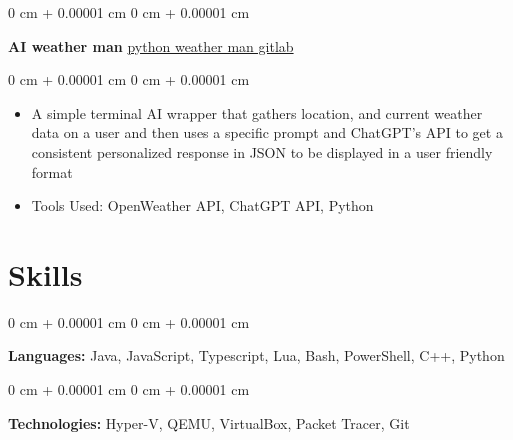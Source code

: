 \documentclass[10pt, letterpaper]{article}
\newenvironment{highlights}{
    \begin{itemize}[
        topsep=0.10 cm,
        parsep=0.10 cm,
        partopsep=0pt,
        itemsep=0pt,
        leftmargin=0 cm + 10pt
    ]
}{
    \end{itemize}
} %
\newenvironment{onecolentry}{
    \begin{adjustwidth}{
        0 cm + 0.00001 cm
    }{
        0 cm + 0.00001 cm
    }
}{
    \end{adjustwidth}
} %
\newenvironment{twocolentry}[2][]{
    \onecolentry
    \def\secondColumn{#2}
    \setcolumnwidth{\fill, 4.5 cm}
    \begin{paracol}{2}
}{
    \switchcolumn \raggedleft \secondColumn
    \end{paracol}
    \endonecolentry
} %
\begin{document}
        \begin{twocolentry}{
            \href{https://gitlab.com/paradigms1/pythonaiwetherman}{python weather man gitlab}
        }
            \textbf{AI weather man}\end{twocolentry}

        \vspace{0.10 cm}
        \begin{onecolentry}
            \begin{highlights}
                \item A simple terminal AI wrapper that gathers location, and current weather data on a user and then uses a specific prompt and ChatGPT's API to get a consistent personalized response in JSON to be displayed in a user friendly format 
                \item Tools Used: OpenWeather API, ChatGPT API, Python 
            \end{highlights}
        \end{onecolentry}




    
    \section{Skills}



        
        \begin{onecolentry}
            \textbf{Languages:} Java, JavaScript, Typescript, Lua, Bash, PowerShell, C++, Python
        \end{onecolentry}

        \vspace{0.2 cm}

        \begin{onecolentry}
            \textbf{Technologies:} Hyper-V, QEMU, VirtualBox, Packet Tracer, Git 
        \end{onecolentry}


    
\end{document}
